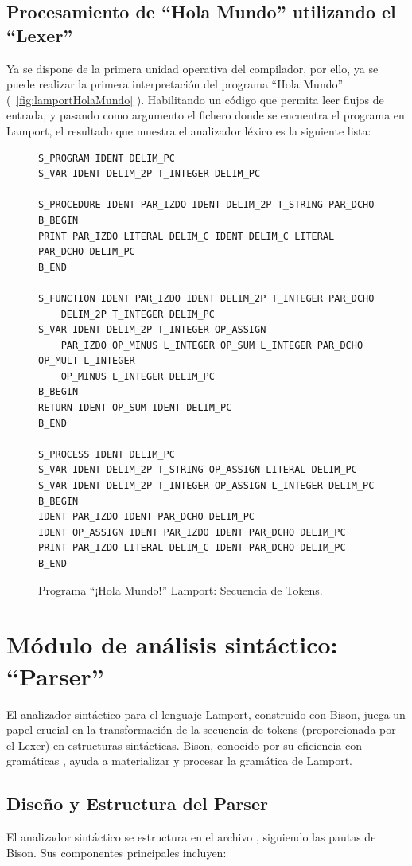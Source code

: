 \subsection{Procesamiento de ``Hola Mundo'' utilizando el ``Lexer''}
Ya se dispone de la primera unidad operativa del compilador, por ello, ya se puede realizar la primera interpretación del programa ``Hola Mundo'' (~\ref{fig:lamportHolaMundo} ). Habilitando un código que permita leer flujos de entrada, y pasando como argumento el fichero donde se encuentra el programa en Lamport, el resultado que muestra el analizador léxico es la siguiente lista:

\begin{figure}[h]
\begin{verbatim}
S_PROGRAM IDENT DELIM_PC
S_VAR IDENT DELIM_2P T_INTEGER DELIM_PC 

S_PROCEDURE IDENT PAR_IZDO IDENT DELIM_2P T_STRING PAR_DCHO 
B_BEGIN 
PRINT PAR_IZDO LITERAL DELIM_C IDENT DELIM_C LITERAL PAR_DCHO DELIM_PC
B_END

S_FUNCTION IDENT PAR_IZDO IDENT DELIM_2P T_INTEGER PAR_DCHO 
    DELIM_2P T_INTEGER DELIM_PC 
S_VAR IDENT DELIM_2P T_INTEGER OP_ASSIGN
    PAR_IZDO OP_MINUS L_INTEGER OP_SUM L_INTEGER PAR_DCHO OP_MULT L_INTEGER 
    OP_MINUS L_INTEGER DELIM_PC
B_BEGIN 
RETURN IDENT OP_SUM IDENT DELIM_PC 
B_END 

S_PROCESS IDENT DELIM_PC 
S_VAR IDENT DELIM_2P T_STRING OP_ASSIGN LITERAL DELIM_PC
S_VAR IDENT DELIM_2P T_INTEGER OP_ASSIGN L_INTEGER DELIM_PC
B_BEGIN 
IDENT PAR_IZDO IDENT PAR_DCHO DELIM_PC 
IDENT OP_ASSIGN IDENT PAR_IZDO IDENT PAR_DCHO DELIM_PC 
PRINT PAR_IZDO LITERAL DELIM_C IDENT PAR_DCHO DELIM_PC 
B_END
\end{verbatim}
\caption{Programa ``¡Hola Mundo!'' Lamport: Secuencia de Tokens.}
\label{fig:tokensHolaMundo}
\end{figure}

\section{Módulo de análisis sintáctico: ``Parser''}\label{sec:implementacionParser}
El analizador sintáctico para el lenguaje Lamport, construido con Bison, juega un papel crucial en la transformación de la secuencia de tokens (proporcionada por el Lexer) en estructuras sintácticas. Bison, conocido por su eficiencia con gramáticas , ayuda a materializar y procesar la gramática de Lamport.

\subsection{Diseño y Estructura del Parser}
El analizador sintáctico se estructura en el archivo , siguiendo las pautas de Bison. Sus componentes principales incluyen:

